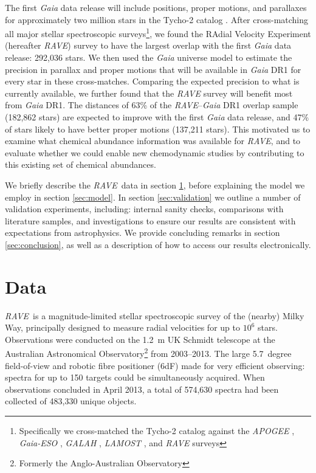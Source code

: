 \documentclass[preprint,trackchanges]{aastex}
\newcommand{\project}[1]{\textsl{#1}}
\newcommand{\rave}{\project{\acronym{RAVE}}}
\newcommand{\acronym}[1]{{\small{#1}}}
\begin{document}
The first \project{Gaia} data release will include positions, proper motions, and 
parallaxes for approximately two million stars in the Tycho-2 \citep{Hog_2000} 
catalog \citep{Michalik_2015a,Michalik_2015b}.  After cross-matching all major 
stellar spectroscopic surveys\footnote{Specifically we cross-matched the Tycho-2
catalog against the \project{APOGEE} \citep{Zasowski_2013}, \project{Gaia-ESO} 
\citep{Gilmore_2012,Randich_2013}, \project{GALAH} \citep{DeSilva_2015},
\project{LAMOST} \citep{Cui_2012}, and \project{RAVE} \citep{Steinmetz_2006} 
surveys}, we found the RAdial Velocity Experiment (hereafter \rave) survey to 
have the largest overlap with the first \project{Gaia} data release: 292,036 
stars.  We then used the \project{Gaia} universe model \citep{Robin_2012} to 
estimate the precision in parallax and proper motions that will be available in 
\project{Gaia} DR1 for every star in these cross-matches.  Comparing the expected
precision to what is currently available, we further found that the \project{RAVE}
survey will benefit most from \project{Gaia} DR1.  The distances of 63\% of the 
\project{RAVE}--\project{Gaia} DR1 overlap sample (182,862 stars) are expected to
improve with the first \project{Gaia} data release, and 47\% of stars likely to
have better proper motions (137,211 stars).  This motivated us to examine what 
chemical abundance information was available for \rave, and to evaluate whether 
we could enable new chemodynamic studies by contributing to this existing set of
chemical abundances.


We briefly describe the \rave\ data in section \ref{sec:data}, before explaining
the model we employ in section \ref{sec:model}.  In section \ref{sec:validation}
we outline a number of validation experiments, including: internal sanity checks,
comparisons with literature samples, and investigations to ensure our results
are consistent with expectations from astrophysics.  We provide concluding
remarks in section \ref{sec:conclusion}, as well as a description of how to
access our results electronically.

\section{Data}
\label{sec:data}


\rave\ is a magnitude-limited stellar spectroscopic survey of the (nearby) Milky Way,
principally designed to measure radial velocities for up to $10^6$ stars.
Observations were conducted on the 1.2~m UK Schmidt telescope at the Australian 
Astronomical Observatory\footnote{Formerly the Anglo-Australian Observatory} from 
2003--2013.  The large 5.7~degree field-of-view and robotic fibre positioner (6dF)
made for very efficient observing: spectra for up to 150 targets could be 
simultaneously acquired.  When observations concluded in April 2013, a total of 
574,630 spectra had been collected of 483,330 unique objects. 
\end{document}
